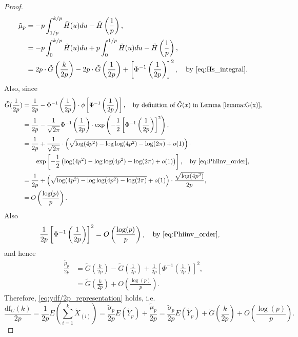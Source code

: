 \begin{proof}
	\begin{equation*}
	\begin{aligned}
	\tilde{\mu}_p &= -p \int_{1/p}^{k/p} \tilde{H}(u) du - \tilde{H}\left(\frac{1}{p}\right),\\
	&= -p \int_{0}^{k/p} \tilde{H}(u) du + p \int_{0}^{1/p} \tilde{H}(u) du - \tilde{H}\left(\frac{1}{p}\right),\\
	&= 2p\cdot \tilde{G}\left(\frac{k}{2p}\right) - 2p \cdot \tilde{G}\left(\frac{1}{2p}\right) + \left[\Phi^{-1}\left(\frac{1}{2p}\right)\right]^2, \quad \text{by \eqref{eq:Hs_integral}}.
	\end{aligned}		
	\end{equation*}
	Also, since
	\begin{equation*}
	\begin{aligned}
	\tilde{G}(\frac{1}{2p}) &= \frac{1}{2p} - \Phi^{-1}\left(\frac{1}{2p}\right) \cdot \phi\left[\Phi^{-1}\left(\frac{1}{2p}\right) \right],\quad \text{by definition of $\tilde{G}(x)$ in Lemma \ref{lemma:G(x)}},\\
	&= \frac{1}{2p} - \frac{1}{\sqrt{2\pi}}\Phi^{-1}\left(\frac{1}{2p}\right) \cdot \exp\left(-\frac{1}{2}\left[\Phi^{-1}\left(\frac{1}{2p}\right) \right]^2\right),\\
	&= \frac{1}{2p} + \frac{1}{\sqrt{2\pi}} \cdot \left(\sqrt{\log(4p^2)-\log\log(4p^2)-\log(2\pi)}+o(1)\right)\cdot \\
	& \qquad \exp\left[-\frac{1}{2} \left(\log(4p^2)-\log\log(4p^2)-\log(2\pi) +o(1)\right)\right], \quad \text{by \eqref{eq:Phiinv_order}},\\
	&= \frac{1}{2p} + \left(\sqrt{\log(4p^2)-\log\log(4p^2)-\log(2\pi)}+o(1)\right)\cdot \frac{\sqrt{\log(4p^2)}}{2p},\\
	&= O\left(\frac{\log(p)}{p}\right).
	\end{aligned}
	\end{equation*}
	Also
	\begin{equation*}
	\begin{aligned}
	\frac{1}{2p}\left[\Phi^{-1}\left(\frac{1}{2p}\right)\right]^2 &= O\left( \frac{\log(p)}{p}\right), \quad \text{by \eqref{eq:Phiinv_order}},
	\end{aligned}
	\end{equation*}
	and hence
	\begin{equation*}
	\begin{aligned}
	\frac{\tilde{\mu}_p}{2p} &= \tilde{G}\left(\frac{k}{2p}\right) - \tilde{G}\left(\frac{1}{2p}\right) + \frac{1}{2p}\left[\Phi^{-1}\left(\frac{1}{2p}\right)\right]^2,\\
	&= \tilde{G}\left(\frac{k}{2p}\right
	) + O\left( \frac{\log(p)}{p}\right).
	\end{aligned}
	\end{equation*}
	Therefore, \eqref{eq:ydf/2p_representation} holds, i.e.
	\begin{equation*}
	\frac{\text{df}_C(k)}{2p}=\frac{1}{2p} E\left(\sum_{i=1}^{k} \tilde{X}_{(i)}\right) = \frac{\tilde{\sigma}_p}{2p} E(\tilde{Y}_p) + \frac{\tilde{\mu}_p}{2p}=\frac{\tilde{\sigma}_p}{2p} E(\tilde{Y}_p) + \tilde{G}\left(\frac{k}{2p}\right) + O\left( \frac{\log(p)}{p}\right).
	\end{equation*}
\end{proof}

